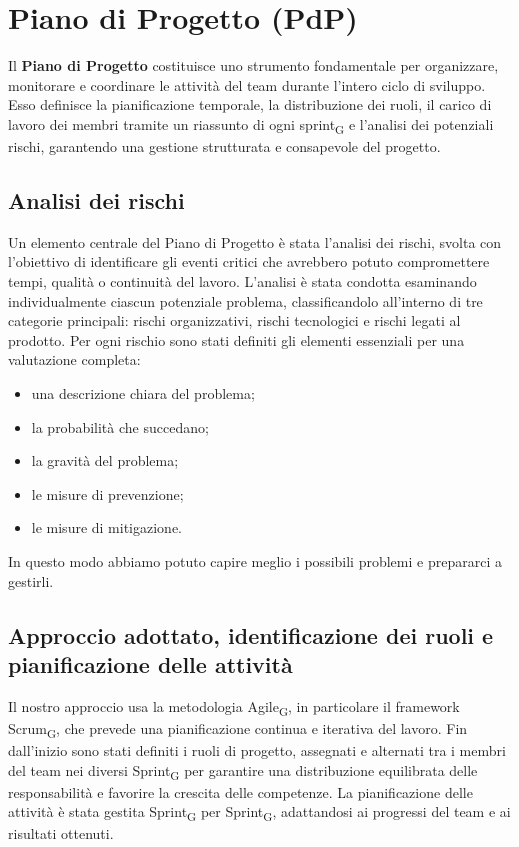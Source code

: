 \documentclass[11pt,a4paper]{article}
\newcommand{\gls}[1]{#1\textsubscript{G}}
\begin{document}
\newpage

\section{Piano di Progetto (PdP)}
Il \textbf{Piano di Progetto} costituisce uno strumento fondamentale per organizzare, monitorare e coordinare le attività del team durante l’intero ciclo di sviluppo. Esso definisce la pianificazione temporale, la distribuzione dei ruoli, il carico di lavoro dei membri tramite un riassunto di ogni \gls{sprint} e l’analisi dei potenziali rischi, garantendo una gestione strutturata e consapevole del progetto.

\subsection{Analisi dei rischi}
Un elemento centrale del Piano di Progetto è stata l’analisi dei rischi, svolta con l’obiettivo di identificare gli eventi critici che avrebbero potuto compromettere tempi, qualità o continuità del lavoro.
L’analisi è stata condotta esaminando individualmente ciascun potenziale problema, classificandolo all’interno di tre categorie principali: rischi organizzativi, rischi tecnologici e rischi legati al prodotto.
Per ogni rischio sono stati definiti gli elementi essenziali per una valutazione completa:
\begin{itemize}
\item una descrizione chiara del problema;
\item la probabilità che succedano;
\item la gravità del problema;
\item le misure di prevenzione;
\item le misure di mitigazione.
\end{itemize}
In questo modo abbiamo potuto capire meglio i possibili problemi e prepararci a gestirli.

\subsection{Approccio adottato, identificazione dei ruoli e pianificazione delle attività}
Il nostro approccio usa la metodologia \gls{Agile}, in particolare il framework \gls{Scrum}, che prevede una pianificazione continua e iterativa del lavoro. 
Fin dall’inizio sono stati definiti i ruoli di progetto, assegnati e alternati tra i membri del team nei diversi \gls{Sprint} per garantire una distribuzione equilibrata delle responsabilità e favorire la crescita delle competenze.
La pianificazione delle attività è stata gestita \gls{Sprint} per \gls{Sprint}, adattandosi ai progressi del team e ai risultati ottenuti. 
\end{document}
